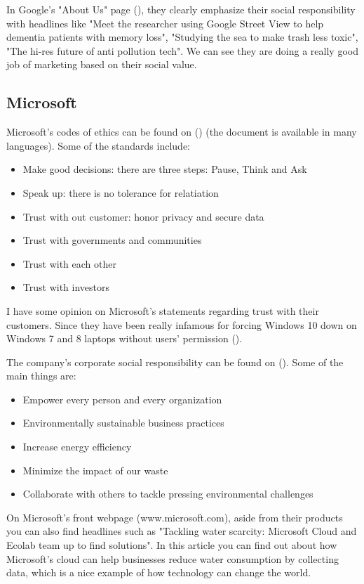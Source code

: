 \documentclass[12pt]{article}
\begin{document}
In Google's "About Us" page (\cite{goa17}), they clearly emphasize their social responsibility with headlines like "Meet the researcher using Google Street View to help dementia patients with memory loss", "Studying the sea to make trash less toxic", "The hi-res future of anti pollution tech". We can see they are doing a really good job of marketing based on their social value.

\subsection{Microsoft}

Microsoft's codes of ethics can be found on (\cite{mssbc}) (the document is available in many languages). Some of the standards include:

\begin{itemize} 
	\item{Make good decisions: there are three steps: Pause, Think and Ask}
	\item{Speak up: there is no tolerance for relatiation}
	\item{Trust with out customer: honor privacy and secure data}
	\item{Trust with governments and communities}
	\item{Trust with each other}
	\item{Trust with investors}
\end{itemize}

I have some opinion on Microsoft's statements regarding trust with their customers. Since they have been really infamous for forcing Windows 10 down on Windows 7 and 8 laptops without users' permission (\cite{kle16}).

The company's corporate social responsibility can be found on (\cite{mscsr}). Some of the main things are:

\begin{itemize}
	\item{Empower every person and every organization}
	\item{Environmentally sustainable business practices}
	\item{Increase energy efficiency}
	\item{Minimize the impact of our waste}
	\item{Collaborate with others to tackle pressing environmental challenges}
\end{itemize}

On Microsoft's front webpage (www.microsoft.com), aside from their products you can also find headlines such as "Tackling water scarcity: Microsoft Cloud and Ecolab team up to find solutions". In this article you can find out about how Microsoft's cloud can help businesses reduce water consumption by collecting data, which is a nice example of how technology can change the world.
\end{document}
